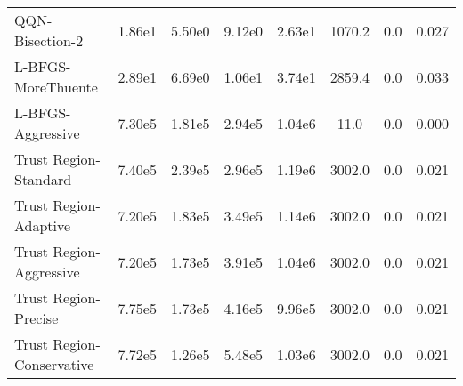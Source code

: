 \documentclass{article}
\begin{document}
\begin{table}[htbp]
{\begin{tabular}{p{2.5cm}*{7}{c}}
QQN-Bisection-2 & 1.86e1 & 5.50e0 & 9.12e0 & 2.63e1 & 1070.2 & 0.0 & 0.027 \\
L-BFGS-MoreThuente & 2.89e1 & 6.69e0 & 1.06e1 & 3.74e1 & 2859.4 & 0.0 & 0.033 \\
L-BFGS-Aggressive & 7.30e5 & 1.81e5 & 2.94e5 & 1.04e6 & 11.0 & 0.0 & 0.000 \\
Trust Region-Standard & 7.40e5 & 2.39e5 & 2.96e5 & 1.19e6 & 3002.0 & 0.0 & 0.021 \\
Trust Region-Adaptive & 7.20e5 & 1.83e5 & 3.49e5 & 1.14e6 & 3002.0 & 0.0 & 0.021 \\
Trust Region-Aggressive & 7.20e5 & 1.73e5 & 3.91e5 & 1.04e6 & 3002.0 & 0.0 & 0.021 \\
Trust Region-Precise & 7.75e5 & 1.73e5 & 4.16e5 & 9.96e5 & 3002.0 & 0.0 & 0.021 \\
Trust Region-Conservative & 7.72e5 & 1.26e5 & 5.48e5 & 1.03e6 & 3002.0 & 0.0 & 0.021 \\
\bottomrule
\end{tabular}
}
\end{table}
\end{document}
